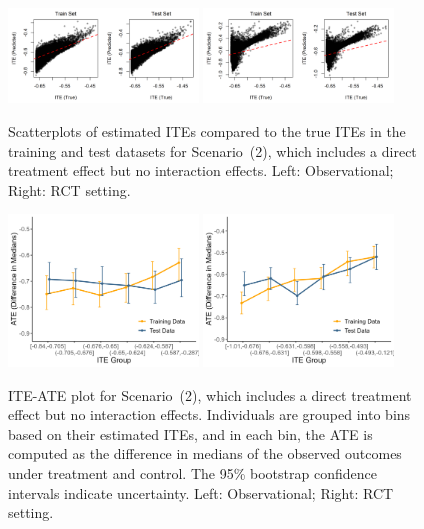 \begin{figure}[htbp]
\centering
\includegraphics[width=0.45\textwidth]{img/results/observ_scenario2_ITE_scatter_train_test.png}
\includegraphics[width=0.45\textwidth]{img/results/rct_scenario2_ITE_scatter_train_test.png}
\caption{Scatterplots of estimated ITEs compared to the true ITEs in the training and test datasets for Scenario~(2), which includes a direct treatment effect but no interaction effects. Left: Observational; Right: RCT setting.}
\label{fig:scenario2_ite_scatter_train_test}
\end{figure}




\begin{figure}[htbp]
\centering
\includegraphics[width=0.45\textwidth]{img/results/observ_scenario2_ITE_cATE.png}
\includegraphics[width=0.45\textwidth]{img/results/rct_scenario2_ITE_cATE.png}
\caption{ITE-ATE plot for Scenario~(2), which includes a direct treatment effect but no interaction effects. Individuals are grouped into bins based on their estimated ITEs, and in each bin, the ATE is computed as the difference in medians of the observed outcomes under treatment and control. The 95\% bootstrap confidence intervals indicate uncertainty. Left: Observational; Right: RCT setting.}
\label{fig:scenario2_ite_cATE}
\end{figure}



